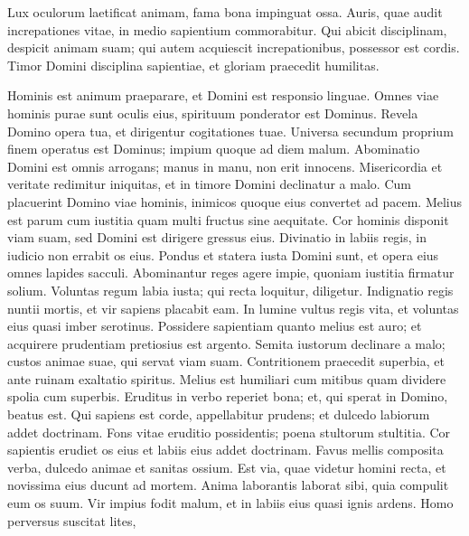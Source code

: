 \begin{biblechapter}
\begin{biblechapter}
\begin{biblechapter}
\begin{biblechapter}
\begin{biblechapter}
\begin{biblechapter}
\begin{biblechapter}
\begin{biblechapter}
\begin{biblechapter}
\begin{biblechapter}
\begin{biblechapter}
\begin{biblechapter}
\begin{biblechapter}
\begin{biblechapter}
\begin{biblechapter}
 \verse Lux oculorum laetificat animam,
 fama bona impinguat ossa.
 \verse Auris, quae audit increpationes vitae,
 in medio sapientium commorabitur.
 \verse Qui abicit disciplinam, despicit animam suam;
 qui autem acquiescit increpationibus, possessor est cordis.
 \verse Timor Domini disciplina sapientiae,
 et gloriam praecedit humilitas.
 
\begin{biblechapter}
 \verse Hominis est animum praeparare,
 et Domini est responsio linguae.
 \verse Omnes viae hominis purae sunt oculis eius,
 spirituum ponderator est Dominus.
 \verse Revela Domino opera tua,
 et dirigentur cogitationes tuae.
 \verse Universa secundum proprium finem operatus est Dominus;
 impium quoque ad diem malum.
 \verse Abominatio Domini est omnis arrogans;
 manus in manu, non erit innocens.
 \verse Misericordia et veritate redimitur iniquitas,
 et in timore Domini declinatur a malo.
 \verse Cum placuerint Domino viae hominis,
 inimicos quoque eius convertet ad pacem.
 \verse Melius est parum cum iustitia
 quam multi fructus sine aequitate.
 \verse Cor hominis disponit viam suam,
 sed Domini est dirigere gressus eius.
 \verse Divinatio in labiis regis,
 in iudicio non errabit os eius.
 \verse Pondus et statera iusta Domini sunt,
 et opera eius omnes lapides sacculi.
 \verse Abominantur reges agere impie,
 quoniam iustitia firmatur solium.
 \verse Voluntas regum labia iusta;
 qui recta loquitur, diligetur.
 \verse Indignatio regis nuntii mortis,
 et vir sapiens placabit eam.
 \verse In lumine vultus regis vita,
 et voluntas eius quasi imber serotinus.
 \verse Possidere sapientiam quanto melius est auro;
 et acquirere prudentiam pretiosius est argento.
 \verse Semita iustorum declinare a malo;
 custos animae suae, qui servat viam suam.
 \verse Contritionem praecedit superbia,
 et ante ruinam exaltatio spiritus.
 \verse Melius est humiliari cum mitibus
 quam dividere spolia cum superbis.
 \verse Eruditus in verbo reperiet bona;
 et, qui sperat in Domino, beatus est.
 \verse Qui sapiens est corde, appellabitur prudens;
 et dulcedo labiorum addet doctrinam.
 \verse Fons vitae eruditio possidentis;
 poena stultorum stultitia.
 \verse Cor sapientis erudiet os eius
 et labiis eius addet doctrinam.
 \verse Favus mellis composita verba,
 dulcedo animae et sanitas ossium.
 \verse Est via, quae videtur homini recta,
 et novissima eius ducunt ad mortem.
 \verse Anima laborantis laborat sibi,
 quia compulit eum os suum.
 \verse Vir impius fodit malum,
 et in labiis eius quasi ignis ardens.
 \verse Homo perversus suscitat lites,

\end{biblechapter}
\end{biblechapter}
\end{biblechapter}
\end{biblechapter}
\end{biblechapter}
\end{biblechapter}
\end{biblechapter}
\end{biblechapter}
\end{biblechapter}
\end{biblechapter}
\end{biblechapter}
\end{biblechapter}
\end{biblechapter}
\end{biblechapter}
\end{biblechapter}
\end{biblechapter}
